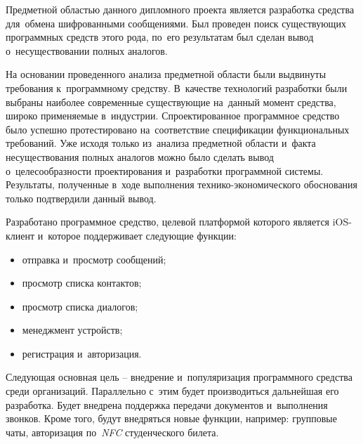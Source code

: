 
Предметной областью данного дипломного проекта является разработка средства для~обмена шифрованными сообщениями. Был проведен поиск существующих программных средств этого рода, по~его результатам был сделан вывод о~несуществовании полных аналогов.

На основании проведенного анализа предметной области были выдвинуты требования к~программному средству. В~качестве технологий разработки были выбраны наиболее современные существующие на~данный момент средства, широко применяемые в~индустрии. Спроектированное программное средство было успешно протестировано на~соответствие спецификации функциональных требований. Уже исходя только из~анализа предметной области и~факта несуществования полных аналогов можно было сделать вывод о~целесообразности проектирования и~разработки программной системы. Результаты, полученные в~ходе выполнения технико-экономического обоснования только подтвердили данный вывод.

Разработано программное средство, целевой платформой которого является iOS-клиент и~которое поддерживает следующие функции:
\begin{itemize}
	\item отправка и~просмотр сообщений;
	\item просмотр списка контактов;
	\item просмотр списка диалогов;
	\item менеджмент устройств;
	\item регистрация и~авторизация.
\end{itemize}

Следующая основная цель -- внедрение и~популяризация программного средства среди организаций. Параллельно с~этим будет производиться дальнейшая его разработка. Будет внедрена поддержка передачи документов и~выполнения звонков. Кроме того, будут внедряться новые функции, например: групповые чаты, авторизация по~\textit{NFC} студенческого билета.